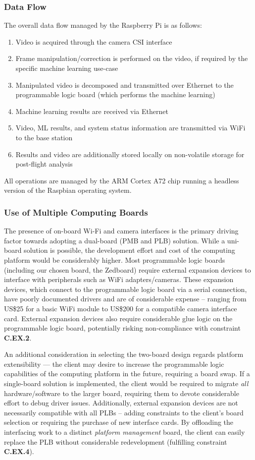 \subsubsection{Data Flow}
The overall data flow managed by the Raspberry Pi is as follows:
\begin{enumerate}
\item Video is acquired through the camera CSI interface
\item Frame manipulation/correction is performed on the video, if required by the specific machine learning use-case
\item Manipulated video is decomposed and transmitted over Ethernet to the programmable logic board (which performs the machine learning)
\item Machine learning results are received via Ethernet
\item Video, ML results, and system status information are transmitted via WiFi to the base station
\item Results and video are additionally stored locally on non-volatile storage for post-flight analysis
\end{enumerate}

All operations are managed by the ARM Cortex A72 chip running a headless version of the Raspbian operating system. 

\subsubsection{Use of Multiple Computing Boards}
The presence of on-board Wi-Fi and camera interfaces is the primary driving factor towards adopting a dual-board (PMB and PLB) solution. While a uni-board solution is possible, the development effort and cost of the computing platform would be considerably higher. Most programmable logic boards (including our chosen board, the Zedboard) require external expansion devices to interface with peripherals such as WiFi adapters/cameras. These expansion devices, which connect to the programmable logic board via a serial connection, have poorly documented drivers and are of considerable expense -- ranging from US\$25 for a basic WiFi module\cite{digiwifi} to US\$200 for a compatible camera interface card\cite{digipmod}. External expansion devices also require considerable glue logic on the programmable logic board, potentially risking non-compliance with constraint \textbf{C.EX.2}.

An additional consideration in selecting the two-board design regards platform extensibility --- the client may desire to increase the programmable logic capabilities of the computing platform in the future, requiring a board swap. If a single-board solution is implemented, the client would be required to migrate \textit{all} hardware/software to the larger board, requiring them to devote considerable effort to debug driver issues. Additionally, external expansion devices are not necessarily compatible with all PLBs -- adding constraints to the client's board selection or requiring the purchase of new interface cards. By offloading the interfacing work to a distinct \textit{platform management} board, the client can easily replace the PLB without considerable redevelopment (fulfilling constraint \textbf{C.EX.4}). 

